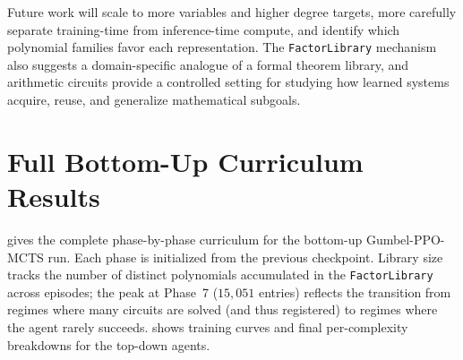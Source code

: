 \documentclass{article}
\theoremstyle{definition}
\theoremstyle{remark}
\begin{document}
Future work will scale to more variables and higher degree targets, more carefully separate training-time from inference-time compute, and identify which polynomial families favor each representation. The \texttt{FactorLibrary} mechanism also suggests a domain-specific analogue of a formal theorem library, and arithmetic circuits provide a controlled setting for studying how learned systems acquire, reuse, and generalize mathematical subgoals.






\appendix

\section{Full Bottom-Up Curriculum Results}
\label{app:additional-results}

 gives the complete phase-by-phase curriculum for the bottom-up Gumbel-PPO-MCTS run. Each phase is initialized from the previous checkpoint. Library size tracks the number of distinct polynomials accumulated in the \texttt{FactorLibrary} across episodes; the peak at Phase~7 ($15{,}051$ entries) reflects the transition from regimes where many circuits are solved (and thus registered) to regimes where the agent rarely succeeds.  shows training curves and final per-complexity breakdowns for the top-down agents.
\end{document}

